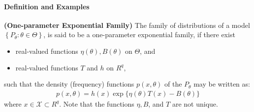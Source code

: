 \documentclass{article}
\newcommand{\bfs}[1]{\textbf{({#1}) }}
\begin{document}
\paragraph{Definition and Examples}
\begin{defa}\bfs{One-parameter Exponential Family}
The family of distributions of a model $\left\{P_{\theta}: \theta \in \Theta\right\}$, is said to be a one-parameter exponential family, if there exist \begin{itemize}
    \item {real-valued functions $\eta(\theta), B(\theta)$} on $\Theta$, and 
    \item {real-valued functions} $T$ and $h$ on $R^{q}$,
\end{itemize}such that the density (frequency) functions $p(x, \theta)$ of the $P_{\theta}$ may be written as: 
\begin{align*}
p(x, \theta)=h(x) \exp \{\eta(\theta) T(x)-B(\theta)\}
\end{align*}
where $x \in \mathcal{X} \subset R^{q}$. Note that the functions $\eta, B$, and $T$ are not unique.
\end{defa}
\end{document}
